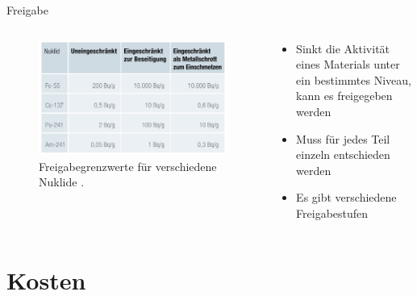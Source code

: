 \begin{frame}{Freigabe}
  \begin{columns}

    \begin{column}{0.48\textwidth}
      \begin{figure}
         \centering
         \includegraphics[width=1\textwidth]{./bilder/freigabeoption.PNG}
         \caption{Freigabegrenzwerte für verschiedene Nuklide \cite{stilllegung_grs}. }
         \label{ fig: freigabegrenzwerte}
       \end{figure}
    \end{column}

    \begin{column}{0.48\textwidth}
      \begin{itemize}
        \setlength\itemsep{1.2em}
        \item{ Sinkt die Aktivität eines Materials unter ein bestimmtes Niveau, kann es freigegeben werden }
        \item{ Muss für jedes Teil einzeln entschieden werden}
        \item {Es gibt verschiedene Freigabestufen}
      \end{itemize}
    \end{column}

  \end{columns}
\end{frame}



\section{Kosten}



